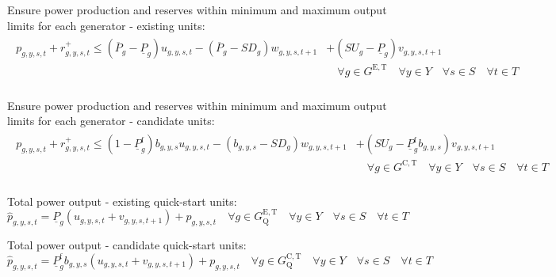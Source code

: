 \documentclass{article}
\newcommand{\sGeneratorsExistingThermal}{G^{\mathrm{E,T}}}
\newcommand{\sGeneratorsCandidateThermal}{G^{\mathrm{C,T}}}
\newcommand{\sYears}{Y}
\newcommand{\sScenarios}{S}
\newcommand{\sIntervals}{T}
\newcommand{\sGeneratorsExistingThermalQuickStart}{G^{\mathrm{E,T}}_\mathrm{Q}}
\newcommand{\sGeneratorsCandidateThermalQuickStart}{G^{\mathrm{C,T}}_\mathrm{Q}}
\newcommand{\iGenerator}{g}
\newcommand{\iYear}{y}
\newcommand{\iScenario}{s}
\newcommand{\iInterval}{t}
\newcommand{\cPowerOutputMax}[1][\iGenerator,\iYear]{\overline{P}_{#1}}
\newcommand{\cPowerOutputMin}[1][\iGenerator]{\underline{P}_{#1}}
\newcommand{\cPowerOutputMinProportion}{\cPowerOutputMin^{\mathrm{f}}}
\newcommand{\cRampRateStartup}[1][\iGenerator]{SU_{#1}}
\newcommand{\cRampRateShutdown}[1][\iGenerator]{SD_{#1}}
\newcommand{\vStartupIndicator}[1][\iGenerator,\iYear,\iScenario,\iInterval]{v_{#1}}
\newcommand{\vShutdownIndicator}[1][\iGenerator,\iYear,\iScenario,\iInterval]{w_{#1}}
\newcommand{\vReserveUp}[1][\iGenerator,\iYear,\iScenario,\iInterval]{r^{+}_{#1}}
\newcommand{\vOnIndicator}[1][\iGenerator,\iYear,\iScenario,\iInterval]{u_{#1}}
\newcommand{\vPower}[1][\iGenerator,\iYear,\iScenario,\iInterval]{p_{#1}}
\newcommand{\vPowerTotal}[1][\iGenerator,\iYear,\iScenario,\iInterval]{\hat{p}_{#1}}
\newcommand{\vInstalledCapacityTotalScenario}[1][\iGenerator,\iYear,\iScenario]{b_{#1}}
\begin{document}
Ensure power production and reserves within minimum and maximum output limits for each generator - existing units:
\begin{align}
	\begin{split}
	\vPower + \vReserveUp \leq \left(\cPowerOutputMax[\iGenerator] - \cPowerOutputMin\right) \vOnIndicator - \left(\cPowerOutputMax[\iGenerator] -\cRampRateShutdown \right) \vShutdownIndicator[\iGenerator,\iYear,\iScenario,\iInterval+1] & + \left(\cRampRateStartup - \cPowerOutputMin\right)\vStartupIndicator[\iGenerator,\iYear,\iScenario,\iInterval+1]\\
	& \quad \forall \iGenerator \in \sGeneratorsExistingThermal \quad \forall \iYear \in \sYears \quad \forall \iScenario \in \sScenarios \quad \forall \iInterval \in \sIntervals\\
	\end{split}
\end{align}

Ensure power production and reserves within minimum and maximum output limits for each generator - candidate units:
\begin{align}
	\begin{split}
		\vPower + \vReserveUp \leq \left(1 - \cPowerOutputMinProportion\right) \vInstalledCapacityTotalScenario \vOnIndicator - \left(\vInstalledCapacityTotalScenario -\cRampRateShutdown \right) \vShutdownIndicator[\iGenerator,\iYear,\iScenario,\iInterval+1] & + \left(\cRampRateStartup - \cPowerOutputMinProportion\vInstalledCapacityTotalScenario \right)\vStartupIndicator[\iGenerator,\iYear,\iScenario,\iInterval+1]\\
		& \quad \forall \iGenerator \in \sGeneratorsCandidateThermal \quad \forall \iYear \in \sYears \quad \forall \iScenario \in \sScenarios \quad \forall \iInterval \in \sIntervals\\
		\label{eqn: power output within limits - candidate}
	\end{split}
\end{align}

Total power output - existing quick-start units:
\begin{equation}
\vPowerTotal = \cPowerOutputMin \left(\vOnIndicator + \vStartupIndicator[\iGenerator,\iYear,\iScenario,\iInterval+1]\right) + \vPower \quad \forall \iGenerator \in \sGeneratorsExistingThermalQuickStart \quad \forall \iYear \in \sYears \quad \forall \iScenario \in \sScenarios \quad \forall \iInterval \in \sIntervals
\end{equation}

Total power output - candidate quick-start units:
\begin{equation}
\vPowerTotal = \cPowerOutputMinProportion \vInstalledCapacityTotalScenario \left(\vOnIndicator + \vStartupIndicator[\iGenerator,\iYear,\iScenario,\iInterval+1]\right) + \vPower \quad \forall \iGenerator \in \sGeneratorsCandidateThermalQuickStart \quad \forall \iYear \in \sYears \quad \forall \iScenario \in \sScenarios \quad \forall \iInterval \in \sIntervals
\label{eqn: total power - quick start}
\end{equation}
\end{document}
